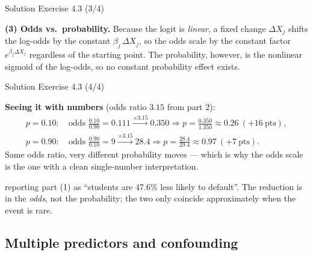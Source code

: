 \documentclass[aspectratio=169,11pt]{beamer}
\begin{document}
\begin{frame}{Solution \textemdash{} Exercise 4.3 (3/4)}
\begin{solutionbox}
\textbf{(3) Odds vs.\ probability.}
Because the logit is \emph{linear}, a fixed change $\Delta X_j$ shifts
the log-odds by the constant $\beta_j\,\Delta X_j$, so the odds scale by
the constant factor $e^{\beta_j \Delta X_j}$ regardless of the starting
point. The probability, however, is the nonlinear sigmoid of the
log-odds, so no constant probability effect exists.
\end{solutionbox}
\end{frame}

\begin{frame}{Solution \textemdash{} Exercise 4.3 (4/4)}
\begin{solutionbox}
\vspace{1mm}
\textbf{Seeing it with numbers} (odds ratio $3.15$ from part 2):
\[
\begin{aligned}
  p=0.10:&\ \text{odds } \tfrac{0.10}{0.90}=0.111
    \xrightarrow{\times 3.15} 0.350
    \Rightarrow p=\tfrac{0.350}{1.350}\approx 0.26\ (+16\ \text{pts}),\\
  p=0.90:&\ \text{odds } \tfrac{0.90}{0.10}=9
    \xrightarrow{\times 3.15} 28.4
    \Rightarrow p=\tfrac{28.4}{29.4}\approx 0.97\ (+7\ \text{pts}).
\end{aligned}
\]
Same odds ratio, very different probability moves --- which is why the
odds scale is the one with a clean single-number interpretation.
\end{solutionbox}
\begin{mistake}
reporting part (1) as ``students are $47.6\%$
less likely to default''. The reduction is in the \emph{odds}, not the
probability; the two only coincide approximately when the event is
rare.
\end{mistake}
\end{frame}

\subsection{Multiple predictors and confounding}
\end{document}

